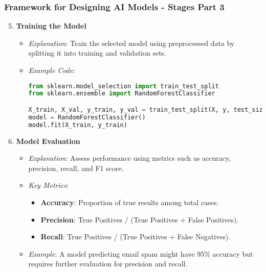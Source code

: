 \documentclass[aspectratio=169]{beamer}
\begin{document}
\begin{frame}[fragile]
    \frametitle{Framework for Designing AI Models - Stages Part 3}
    \begin{enumerate}
        \setcounter{enumi}{4} %
        \item \textbf{Training the Model}
        \begin{itemize}
            \item \textit{Explanation}: Train the selected model using preprocessed data by splitting it into training and validation sets.
            \item \textit{Example Code}:
            \begin{lstlisting}[language=Python]
from sklearn.model_selection import train_test_split
from sklearn.ensemble import RandomForestClassifier

X_train, X_val, y_train, y_val = train_test_split(X, y, test_size=0.2, random_state=42)
model = RandomForestClassifier()
model.fit(X_train, y_train)
            \end{lstlisting}
        \end{itemize}

        \item \textbf{Model Evaluation}
        \begin{itemize}
            \item \textit{Explanation}: Assess performance using metrics such as accuracy, precision, recall, and F1 score.
            \item \textit{Key Metrics}:
            \begin{itemize}
                \item \textbf{Accuracy}: Proportion of true results among total cases.
                \item \textbf{Precision}: True Positives / (True Positives + False Positives).
                \item \textbf{Recall}: True Positives / (True Positives + False Negatives).
            \end{itemize}
            \item \textit{Example}: A model predicting email spam might have 95\% accuracy but requires further evaluation for precision and recall.
        \end{itemize}
    \end{enumerate}
\end{frame}
\end{document}
